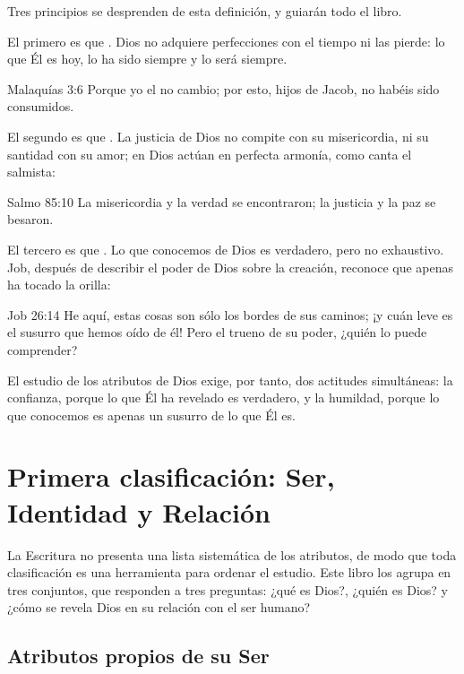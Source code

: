 Tres principios se desprenden de esta definición, y guiarán todo el libro.

El primero es que . Dios no adquiere perfecciones con el tiempo ni las pierde: lo que Él es hoy, lo ha sido siempre y lo será siempre.

\begin{verso}{Malaquías 3:6}
Porque yo el \SENOR{} no cambio; por esto, hijos de Jacob, no habéis sido consumidos.
\end{verso}

El segundo es que . La justicia de Dios no compite con su misericordia, ni su santidad con su amor; en Dios actúan en perfecta armonía, como canta el salmista:

\begin{verso}{Salmo 85:10}
La misericordia y la verdad se encontraron; la justicia y la paz se besaron.
\end{verso}

El tercero es que . Lo que conocemos de Dios es verdadero, pero no exhaustivo. Job, después de describir el poder de Dios sobre la creación, reconoce que apenas ha tocado la orilla:

\begin{verso}{Job 26:14}
He aquí, estas cosas son sólo los bordes de sus caminos; ¡y cuán leve es el susurro que hemos oído de él! Pero el trueno de su poder, ¿quién lo puede comprender?
\end{verso}

El estudio de los atributos de Dios exige, por tanto, dos actitudes simultáneas: la confianza, porque lo que Él ha revelado es verdadero, y la humildad, porque lo que conocemos es apenas un susurro de lo que Él es.

\section{Primera clasificación: Ser, Identidad y Relación}

La Escritura no presenta una lista sistemática de los atributos, de modo que toda clasificación es una herramienta para ordenar el estudio. Este libro los agrupa en tres conjuntos, que responden a tres preguntas: ¿qué es Dios?, ¿quién es Dios? y ¿cómo se revela Dios en su relación con el ser humano?

\subsection{Atributos propios de su Ser}

